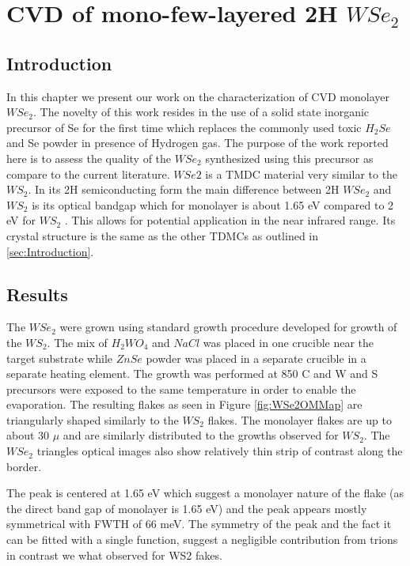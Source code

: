 \chapter{CVD of mono-few-layered 2H $WSe_2$}

\section{Introduction}
	
In this chapter we present our work on the characterization of CVD monolayer $WSe_2$. The novelty of this work resides in the use of a solid state inorganic precursor of Se for the first time which replaces the commonly used toxic $H_2Se$ and Se powder in presence of Hydrogen gas.  The purpose of the work reported here is to assess the quality of the $WSe_2$ synthesized using this precursor as compare to the current literature. $WSe2$ is a TMDC material very similar to the $WS_2$. In its 2H semiconducting form the main difference between 2H $WSe_2$ and $WS_2$ is its optical bandgap which for monolayer is about 1.65 eV compared to 2 eV for $WS_2$ . This allows for potential application in the near infrared range. Its crystal structure is the same as the other TDMCs as outlined in \ref{sec:Introduction}.
	
\section{Results}

The $WSe_2$ were grown using standard growth procedure developed for growth of the $WS_2$. The mix of $H_2WO_4$ and $NaCl$ was placed in one crucible near the target substrate while $ZnSe$ powder was placed in a separate crucible in a separate heating element. The growth was performed at 850 {\degree}C and W and S precursors were exposed to the same temperature in order to enable the evaporation. The resulting flakes as seen in Figure \ref{fig:WSe2OMMap} are triangularly shaped similarly to the $WS_2$ flakes. The monolayer flakes are up to about 30 $\mu$ and are similarly distributed to the growths observed for $WS_2$. The $WSe_2$ triangles optical images also show relatively thin strip of contrast along the border.


The peak is centered at 1.65 eV which suggest a monolayer nature of the flake (as the direct band gap of monolayer is 1.65 eV) and the peak appears mostly symmetrical with FWTH of 66 meV. The symmetry of the peak and the fact it can be fitted with a single function, suggest a negligible contribution from trions in contrast we what observed for WS2  fakes. 

